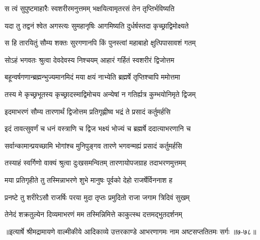 \twolineshloka
{स त्वं सुपुष्टमाहारैः स्वशरीरमनुत्तमम्}
{भक्षयित्वामृतरसं तेन तृप्तिर्भविष्यति} %

\twolineshloka
{यदा तु तद्वनं श्वेत अगस्त्यः सुमहानृषिः}
{आगमिष्यति दुर्धर्षस्तदा कृच्छ्राद्विमोक्ष्यते} %

\twolineshloka
{स हि तारयितुं सौम्य शक्तः सुरगणानपि}
{किं पुनस्त्वां महाबाहो क्षुत्पिपासावशं गतम्} %

\twolineshloka
{सोऽहं भगवतः श्रुत्वा देवदेवस्य निश्चयम्}
{आहारं गर्हितं स्वशरीरं द्विजोत्तम} %

\twolineshloka
{बहून्वर्षगणान्ब्रह्मन्भुज्यमानमिदं मया}
{क्षयं नाभ्येति ब्रह्मर्षे तृप्तिश्चापि ममोत्तमा} %

\twolineshloka
{तस्य मे कृच्छ्रभूतस्य कृच्छ्रादस्माद्विमोचय}
{अन्येषां न गतिर्ह्यत्र कुम्भयोनिमृते द्विजम्} %

\twolineshloka
{इदमाभरणं सौम्य तारणार्थं द्विजोत्तम}
{प्रतिगृह्णीष्व भद्रं ते प्रसादं कर्तुमर्हसि} %

\twolineshloka
{इदं तावत्सुवर्णं च धनं वस्त्राणि च द्विज}
{भक्ष्यं भोज्यं च ब्रह्मर्षे ददात्याभरणानि च} %

\twolineshloka
{सर्वान्कामान्प्रयच्छामि भोगांश्च मुनिपुङ्गव}
{तारणे भगवन्मह्यं प्रसादं कर्तुमर्हसि} %

\twolineshloka
{तस्याहं स्वर्गिणो वाक्यं श्रुत्वा दुःखसमन्वितम्}
{तारणायोपजग्राह तदाभरणमुत्तमम्} %

\twolineshloka
{मया प्रतिगृहीते तु तस्मिन्नाभरणे शुभे}
{मानुषः पूर्वको देहो राजर्षेर्विननाश ह} %

\twolineshloka
{प्रनष्टे तु शरीरेऽसौ राजर्षिः परया मुदा}
{तृप्तः प्रमुदितो राजा जगाम त्रिदिवं सुखम्} %

\twolineshloka
{तेनेदं शक्रतुल्येन दिव्यमाभरणं मम}
{तस्मिन्निमित्ते काकुत्स्थ दत्तमद्भुतदर्शनम्} %


॥इत्यार्षे श्रीमद्रामायणे वाल्मीकीये आदिकाव्ये उत्तरकाण्डे आभरणागमः नाम अष्टसप्ततितमः सर्गः ॥७-७८॥

